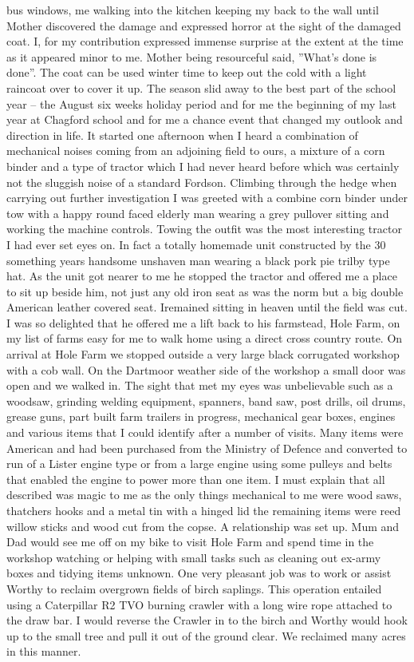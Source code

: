 bus windows, me walking into the kitchen keeping my back to the wall until
Mother discovered the damage and expressed horror at the sight of the damaged
coat.  I, for my contribution expressed immense surprise at the extent at the
time as it appeared minor to me.  Mother being resourceful said, ''What's done
is done''.  The coat can be used winter time to keep out the cold with a light
raincoat over to cover it up.  The season slid away to the best part of the
school year – the August six weeks holiday period and for me the beginning of
my last year at Chagford school and for me a chance event that changed my
outlook and direction in life.  It started one afternoon when I heard a
combination of mechanical noises coming from an adjoining field to ours, a
mixture of a corn binder and a type of tractor which I had never heard before
which was certainly not the sluggish noise of a standard Fordson.  Climbing
through the hedge when carrying out further investigation I was greeted with a
combine corn binder under tow with a happy round faced elderly man wearing a
grey pullover sitting and working the machine controls.  Towing the outfit was
the most interesting tractor I had ever set eyes on.  In fact a totally
homemade unit constructed by the 30 something years handsome unshaven man
wearing a black pork pie trilby type hat.  As the unit got nearer to me he
stopped the tractor and offered me a place to sit up beside him, not just any
old iron seat as was the norm but a big double American leather covered seat.
Iremained sitting in heaven until the field was cut.  I was so delighted that
he offered me a lift back to his farmstead, Hole Farm, on my list of farms easy
for me to walk home using a direct cross country route.  On arrival at Hole
Farm we stopped outside a very large black corrugated workshop with a cob wall.
On the Dartmoor weather side of the workshop a small door was open and we
walked in. The sight that met my eyes was unbelievable such as a woodsaw,
grinding welding equipment, spanners, band saw, post drills, oil drums, grease
guns, part built farm trailers in progress, mechanical gear boxes, engines and
various items that I could identify after a number of visits.  Many items were
American and had been purchased from the Ministry of Defence and converted to
run of a Lister engine type or from a large engine using some pulleys and belts
that enabled the engine to power more than one item.  I must explain that all
described was magic to me as the only things  mechanical to me were wood saws,
thatchers hooks and a metal tin with a hinged lid the remaining items were reed
willow sticks and wood cut from the copse. A relationship was set up.  Mum and
Dad would see me off on my bike to visit Hole Farm and spend time in the
workshop watching or helping with small tasks such as cleaning out ex-army
boxes and tidying items unknown.  One very pleasant job was to work or assist
Worthy to reclaim overgrown fields of birch saplings.  This operation entailed
using a Caterpillar R2 TVO burning crawler with a long wire rope attached to
the draw bar.  I would reverse the Crawler in to the birch and Worthy would
hook up to the small tree and pull it out of the ground clear.  We reclaimed
many acres in this manner.
